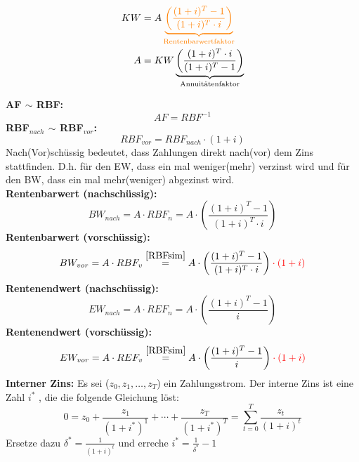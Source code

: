 \documentclass[leqno]{scrartcl}
\begin{document}
\begin{multicols}{4}
\begin{equation*}
\begin{split}
      KW &= A\color{orange} \underbrace{\left(\frac{(1+i)^T-1}{(1+i)^T \cdot i}\right)}_\text{Rentenbarwertfaktor}\\
      A  &= KW \underbrace{\left(\frac{(1+i)^T \cdot i}{(1+i)^T-1}\right)}_\text{Annuitätenfaktor}\\
    \end{split}
  \end{equation*}
\begin{center}
\end{center}
\textbf{AF $\sim$ RBF:}
  \begin{equation*}
    AF = RBF^{-1}
  \end{equation*}
\textbf{RBF$_{nach}$ $\sim$ RBF$_{vor}$:}
  \begin{equation*}\label{RBFsim}
    RBF_{vor} = RBF_{nach} \cdot (1+i)
  \end{equation*}
Nach(Vor)schüssig bedeutet, dass Zahlungen direkt nach(vor) dem Zins 
stattfinden. D.h. für den EW, dass ein mal weniger(mehr) verzinst wird und für 
den BW, dass ein mal mehr(weniger) abgezinst wird.\\
\textbf{Rentenbarwert (nachschüssig):}
  \begin{equation*}
    BW_{nach} = A \cdot RBF_n = A \cdot \left(\frac{(1+i)^T - 1}{(1+i)^T \cdot i}\right)
  \end{equation*}
\textbf{Rentenbarwert (vorschüssig):}
  \begin{equation*}
    BW_{vor} = A \cdot RBF_v \overset{\ref{RBFsim}}{=} A \cdot \left(\frac{(1+i)^T - 1}{(1+i)^T \cdot i}\right)\color{red} \cdot (1+i) 
  \end{equation*}
\textbf{Rentenendwert (nachschüssig):}
  \begin{equation*}
    EW_{nach} = A \cdot REF_n = A \cdot \left(\frac{(1+i)^T - 1}{i}\right)
  \end{equation*}
\textbf{Rentenendwert (vorschüssig):}
  \begin{equation*}
    EW_{vor} = A \cdot REF_v \overset{\ref{RBFsim}}{=} A \cdot \left(\frac{(1+i)^T - 1}{i}\right)\color{red} \cdot (1+i)
  \end{equation*}
\textbf{Interner Zins:}
  Es sei ($z_0, z_1, \dots, z_T$) ein Zahlungsstrom. Der interne Zins ist eine Zahl $i^*$ , die 
  die folgende Gleichung löst:
  $$0 = z_0 + \frac{z_1}{(1+i^*)^1} + \cdots + \frac{z_T}{(1+i^*)^T} = \sum^T_{t=0}\frac{z_t}{(1+i)^t}$$
  Ersetze dazu $\delta^* = \frac{1}{(1+i)^t}$ und erreche $i^* = \frac{1}{\delta^*}-1$


\end{multicols}
\end{document}
